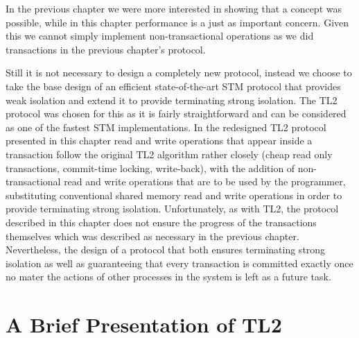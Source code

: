In the previous chapter we were more interested in showing that a concept was
possible, while in this chapter performance is a just as important concern.
Given this we cannot simply implement non-transactional
operations as we did transactions in the previous chapter's protocol.

Still it is not necessary to design a completely new protocol, instead we
choose to take the base design of an efficient state-of-the-art STM protocol
that provides weak isolation and extend it to provide terminating strong isolation.
The TL2 protocol was chosen for this as it is fairly straightforward
and can be considered as one of the fastest STM implementations.
In the redesigned TL2 protocol presented in this chapter
 read   and write operations that appear inside a 
transaction follow the original TL2 algorithm rather closely (cheap read 
only transactions, commit-time locking, write-back), 
with the addition of non-transactional read and  write operations 
that are to be used 
by the programmer, substituting conventional
shared memory read and write operations in order to provide
terminating strong isolation. 
Unfortunately, as with TL2, the protocol described in this chapter
does not ensure the progress of the transactions themselves which
was described as necessary in the previous chapter.
Nevertheless, the design of a protocol that both ensures terminating strong isolation
as well as guaranteeing that every transaction is committed exactly
once no mater the actions of other processes in the system
is left as a future task.



\section{A Brief Presentation of TL2}
\label{sec:tl2}


